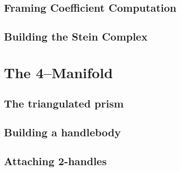 	\subsection{Framing Coefficient Computation}
	\label{sub:gleams}
	
	
	\subsection{Building the Stein Complex}
	\label{sub:steinbuild}
	

\section{The 4--Manifold}
\label{sec:4man}


	\subsection{The triangulated prism}
	
	
	\subsection{Building a handlebody}
	
	
	\subsection{Attaching 2-handles}
	

